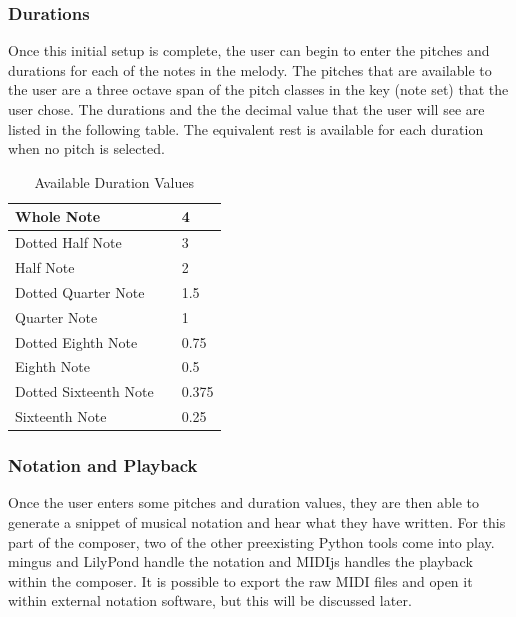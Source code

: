 \subsubsection{Durations}
\label{subsubsec:durations}

Once this initial setup is complete, the user can begin to enter the pitches and durations for each of the notes in the melody.  The pitches that are available to the user are a three octave span of the pitch classes in the key (note set) that the user chose.  The durations and the the decimal value that the user will see are listed in the following table.  The equivalent rest is available for each duration when no pitch is selected.

\begin{table}[!htbp]
	\centering
	\caption{Available Duration Values}
	\begin{tabular}{|l|l|l|}
		\hline
		Whole Note & \musWhole & 4 \\ \hline
		Dotted Half Note & \musHalfDotted & 3 \\ \hline
		Half Note & \musHalf & 2 \\ \hline
		Dotted Quarter Note & \musQuarterDotted & 1.5 \\ \hline
		Quarter Note & \musQuarter & 1 \\ \hline
		Dotted Eighth Note & \musEighthDotted & 0.75 \\ \hline
		Eighth Note & \musEighth & 0.5 \\ \hline
		Dotted Sixteenth Note & \musSixteenthDotted & 0.375 \\ \hline
		Sixteenth Note & \musSixteenth & 0.25 \\ \hline
	\end{tabular}
\end{table}

\subsubsection{Notation and Playback}
\label{subsubsec:notationandplayback}

Once the user enters some pitches and duration values, they are then able to generate a snippet of musical notation and hear what they have written.  For this part of the composer, two of the other preexisting Python tools come into play.  mingus and LilyPond handle the notation and MIDIjs handles the playback within the composer.  It is possible to export the raw MIDI files and open it within external notation software, but this will be discussed later.


